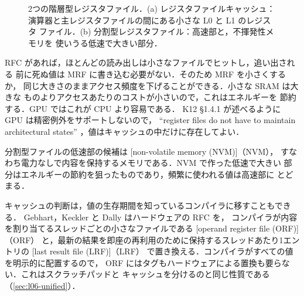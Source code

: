\documentclass[../main.tex]{subfiles}
\begin{document}
\begin{figure}[tb]
  \centering
  
  \caption{2つの階層型レジスタファイル．(a) レジスタファイルキャッシュ：
    演算器と主レジスタファイルの間にある小さな L0 と L1 のレジスタ
    ファイル．(b) 分割型レジスタファイル：高速部と，不揮発性メモリを
    使いうる低速で大きい部分．}
  \label{fig:l06-rf-hierarchy}
\end{figure}

RFC があれば，ほとんどの読み出しは小さなファイルでヒットし，追い出される
前に死ぬ値は MRF に書き込む必要がない．そのため MRF を小さくするか，
同じ大きさのままアクセス頻度を下げることができる．小さな SRAM は大きな
ものよりアクセスあたりのコストが小さいので，これはエネルギーを
節約する．GPU ではこれが CPU より容易である．
K12 §1.4.1 が述べるように GPU は精密例外をサポートしないので，
\enquote{register files do not have to maintain architectural states}
\cite{kim2012gpgpu}，値はキャッシュの中だけに存在してよい．

分割型ファイルの低速部の候補は
[non-volatile memory (NVM)]（NVM），
すなわち電力なしで内容を保持するメモリである．NVM で作った低速で大きい
部分はエネルギーの節約を狙ったものであり，頻繁に使われる値は高速部に
とどまる．

キャッシュの判断は，値の生存期間を知っているコンパイラに移すこともできる．
Gebhart，Keckler と Dally \cite{gebhart2011compile} はハードウェアの RFC を，
コンパイラが内容を割り当てるスレッドごとの小さなファイルである
[operand register file (ORF)]（ORF）
と，最新の結果を即座の再利用のために保持するスレッドあたり1エントリの
[last result file (LRF)]（LRF）
で置き換える．コンパイラがすべての値を明示的に配置するので，
ORF にはタグもハードウェアによる置換も要らない．これはスクラッチパッドと
キャッシュを分けるのと同じ性質である（\cref{sec:l06-unified}）．
\end{document}
